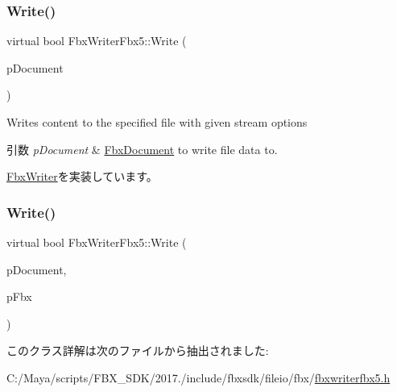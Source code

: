 \subsubsection{\texorpdfstring{Write()}{Write()}\hspace{0.1cm}{\footnotesize\ttfamily [1/2]}}
{\footnotesize\ttfamily virtual bool Fbx\+Writer\+Fbx5\+::\+Write (\begin{DoxyParamCaption}\item[{\hyperlink{class_fbx_document}{Fbx\+Document} $\ast$}]{p\+Document }\end{DoxyParamCaption})\hspace{0.3cm}{\ttfamily [virtual]}}

Writes content to the specified file with given stream options 
\begin{DoxyParams}{引数}
{\em p\+Document} & \hyperlink{class_fbx_document}{Fbx\+Document} to write file data to. \\
\hline
\end{DoxyParams}


\hyperlink{class_fbx_writer_aa8c0277611da0fdb0b9a184c55c30c2c}{Fbx\+Writer}を実装しています。

\mbox{\label{class_fbx_writer_fbx5_ada64b2a137b4a93815496927725dc482}} 
\subsubsection{\texorpdfstring{Write()}{Write()}\hspace{0.1cm}{\footnotesize\ttfamily [2/2]}}
{\footnotesize\ttfamily virtual bool Fbx\+Writer\+Fbx5\+::\+Write (\begin{DoxyParamCaption}\item[{\hyperlink{class_fbx_document}{Fbx\+Document} $\ast$}]{p\+Document,  }\item[{\hyperlink{class_fbx_i_o}{Fbx\+IO} $\ast$}]{p\+Fbx }\end{DoxyParamCaption})\hspace{0.3cm}{\ttfamily [virtual]}}



このクラス詳解は次のファイルから抽出されました\+:\begin{DoxyCompactItemize}
\item 
C\+:/\+Maya/scripts/\+F\+B\+X\+\_\+\+S\+D\+K/2017./include/fbxsdk/fileio/fbx/\hyperlink{fbxwriterfbx5_8h}{fbxwriterfbx5.\+h}\end{DoxyCompactItemize}
